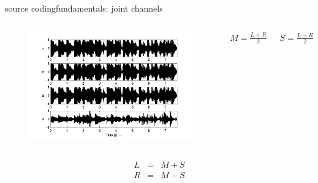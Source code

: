 	\begin{frame}{source coding}{fundamentals: joint channels}
        \vspace{-5mm}
        \begin{columns}
			\begin{figure}
				\centering
				\includegraphics[scale=0.6]{Graph/ms}
			\end{figure}
                
                \bigskip
                \bigskip
                \bigskip
                \bigskip
                \bigskip
                $M = \frac{L+R}{2}$
                
                \bigskip
                \bigskip
                $S = \frac{L-R}{2}$
			\end{columns}
			\vspace{-2mm}
            \begin{eqnarray*}
                L &=& M + S\\
                R &=& M - S 
            \end{eqnarray*}
	\end{frame}

	
